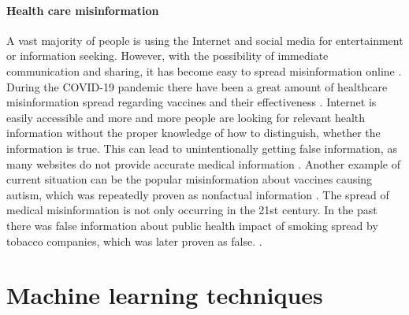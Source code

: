 \documentclass[11pt ,english,a4paper]{article}
\begin{document}
\paragraph{Health care misinformation}
A vast majority of people is using the Internet and social media for entertainment or information seeking. However, with the possibility of immediate communication and sharing, it has become easy to spread misinformation online \cite{wa19sys}. During the COVID-19 pandemic there have been a great amount of healthcare misinformation spread regarding vaccines and their effectiveness \cite{chap22unmask}. Internet is easily accessible and more and more people are looking for relevant health information without the proper knowledge of how to distinguish, whether the information is true. This can lead to unintentionally getting false information, as many websites do not provide accurate medical information \cite{cook15misinfo}. Another example of current situation can be the popular misinformation about vaccines causing autism, which was repeatedly proven as nonfactual information \cite{wa19sys}. 
The spread of medical misinformation is not only occurring in the 21st century. In the past there was false information about public health impact of smoking spread by tobacco companies, which was later proven as false. \cite{cook15misinfo}.

\section{Machine learning techniques} \label{tech}
\end{document}
